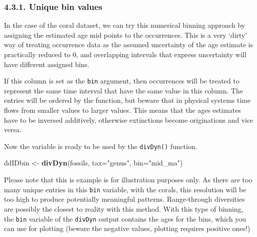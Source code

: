 \documentclass[]{article}
\newenvironment{Shaded}{\begin{snugshade}}{\end{snugshade}}
\newcommand{\KeywordTok}[1]{\textcolor[rgb]{0.13,0.29,0.53}{\textbf{{#1}}}}
\newcommand{\DataTypeTok}[1]{\textcolor[rgb]{0.13,0.29,0.53}{{#1}}}
\newcommand{\DecValTok}[1]{\textcolor[rgb]{0.00,0.00,0.81}{{#1}}}
\newcommand{\StringTok}[1]{\textcolor[rgb]{0.31,0.60,0.02}{{#1}}}
\newcommand{\NormalTok}[1]{{#1}}
\begin{document}
\subsubsection{4.3.1. Unique bin values}\label{unique-bin-values}

In the case of the coral dataset, we can try this numerical binning
approach by assigning the estimated age mid points to the occurrences.
This is a very `dirty' way of treating occurrence data as the assumed
uncertainty of the age estimate is practically reduced to 0, and
overlapping intervals that express uncertainty will have different
assigned bins.

\begin{Shaded}
\end{Shaded}

If this column is set as the \texttt{bin} argument, then occurrences
will be treated to represent the same time interval that have the same
value in this column. The entries will be ordered by the function, but
beware that in physical systems time flows from smaller values to larger
values. This means that the ages estimates have to be inversed
additively, otherwise extinctions become originations and vice versa.

\begin{Shaded}
\end{Shaded}

Now the variable is ready to be used by the \texttt{divDyn()} function.

\begin{Shaded}
\begin{Highlighting}[]
\NormalTok{ddIDbin <-}\StringTok{ }\KeywordTok{divDyn}\NormalTok{(fossils, }\DataTypeTok{tax=}\StringTok{"genus"}\NormalTok{, }\DataTypeTok{bin=}\StringTok{"mid_ma"}\NormalTok{)}
\end{Highlighting}
\end{Shaded}

Please note that this is example is for illustration purposes only. As
there are too many unique entries in this \texttt{bin} variable, with
the corals, this resolution will be too high to produce potentially
meaningful patterns. Range-through diversities are possibly the closest
to reality with this method. With this type of binning, the \texttt{bin}
variable of the \texttt{divDyn} output contains the ages for the bins,
which you can use for plotting (beware the negative values, plotting
requires positive ones!)
\end{document}
